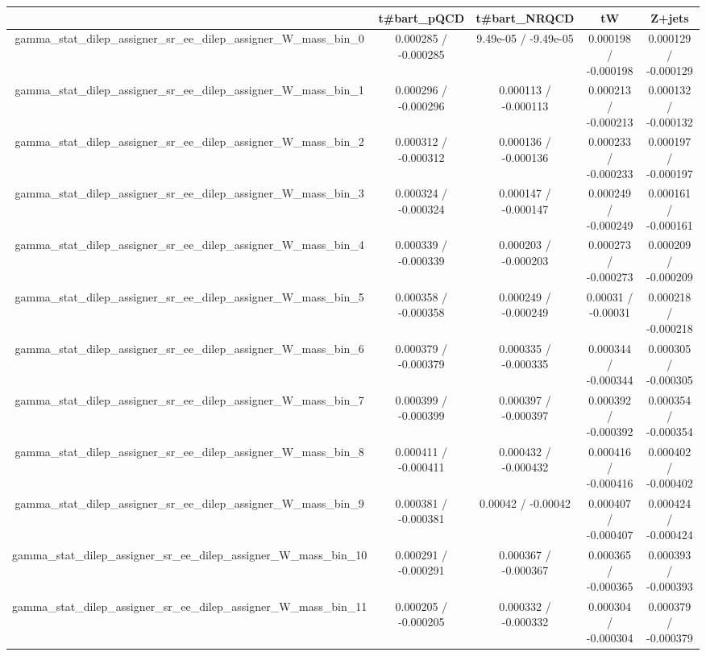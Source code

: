 \documentclass[10pt]{article}
\begin{document}
\begin{table}[htbp]
\begin{center}
\begin{tabular}{|c|c|c|c|c|}
\hline 
      & t#bar{t}_{pQCD}      & t#bar{t}_{NRQCD}      & tW      & Z+jets \\ 
\hline 
  gamma_stat_dilep_assigner_sr_ee_dilep_assigner_W_mass_bin_0 & 0.000285 / -0.000285 & 9.49e-05 / -9.49e-05 & 0.000198 / -0.000198 & 0.000129 / -0.000129 \\ 
  gamma_stat_dilep_assigner_sr_ee_dilep_assigner_W_mass_bin_1 & 0.000296 / -0.000296 & 0.000113 / -0.000113 & 0.000213 / -0.000213 & 0.000132 / -0.000132 \\ 
  gamma_stat_dilep_assigner_sr_ee_dilep_assigner_W_mass_bin_2 & 0.000312 / -0.000312 & 0.000136 / -0.000136 & 0.000233 / -0.000233 & 0.000197 / -0.000197 \\ 
  gamma_stat_dilep_assigner_sr_ee_dilep_assigner_W_mass_bin_3 & 0.000324 / -0.000324 & 0.000147 / -0.000147 & 0.000249 / -0.000249 & 0.000161 / -0.000161 \\ 
  gamma_stat_dilep_assigner_sr_ee_dilep_assigner_W_mass_bin_4 & 0.000339 / -0.000339 & 0.000203 / -0.000203 & 0.000273 / -0.000273 & 0.000209 / -0.000209 \\ 
  gamma_stat_dilep_assigner_sr_ee_dilep_assigner_W_mass_bin_5 & 0.000358 / -0.000358 & 0.000249 / -0.000249 & 0.00031 / -0.00031 & 0.000218 / -0.000218 \\ 
  gamma_stat_dilep_assigner_sr_ee_dilep_assigner_W_mass_bin_6 & 0.000379 / -0.000379 & 0.000335 / -0.000335 & 0.000344 / -0.000344 & 0.000305 / -0.000305 \\ 
  gamma_stat_dilep_assigner_sr_ee_dilep_assigner_W_mass_bin_7 & 0.000399 / -0.000399 & 0.000397 / -0.000397 & 0.000392 / -0.000392 & 0.000354 / -0.000354 \\ 
  gamma_stat_dilep_assigner_sr_ee_dilep_assigner_W_mass_bin_8 & 0.000411 / -0.000411 & 0.000432 / -0.000432 & 0.000416 / -0.000416 & 0.000402 / -0.000402 \\ 
  gamma_stat_dilep_assigner_sr_ee_dilep_assigner_W_mass_bin_9 & 0.000381 / -0.000381 & 0.00042 / -0.00042 & 0.000407 / -0.000407 & 0.000424 / -0.000424 \\ 
  gamma_stat_dilep_assigner_sr_ee_dilep_assigner_W_mass_bin_10 & 0.000291 / -0.000291 & 0.000367 / -0.000367 & 0.000365 / -0.000365 & 0.000393 / -0.000393 \\ 
  gamma_stat_dilep_assigner_sr_ee_dilep_assigner_W_mass_bin_11 & 0.000205 / -0.000205 & 0.000332 / -0.000332 & 0.000304 / -0.000304 & 0.000379 / -0.000379 \\ 

\end{tabular}
\end{center}
\end{table}
\end{document}
